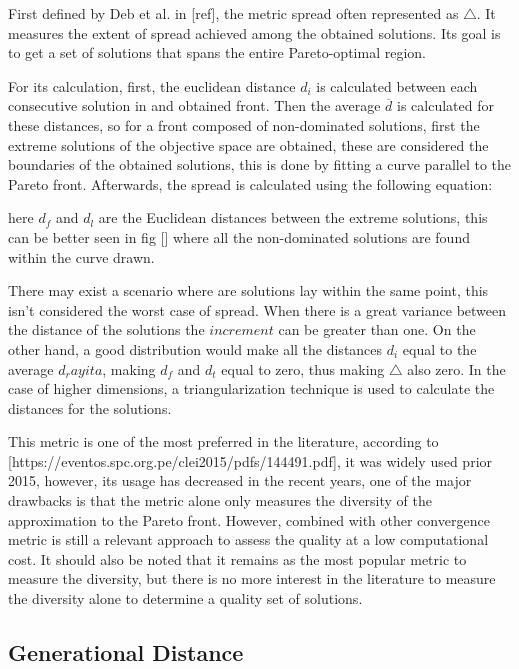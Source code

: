 First defined by Deb et al. in [ref], the metric spread often represented as $\bigtriangleup$. It measures the extent of spread achieved among the obtained solutions. Its goal is to get a set of solutions that spans the entire Pareto-optimal region.

For its calculation, first, the euclidean distance $d_i$ is calculated between each consecutive solution in and obtained front. Then the average $\overline{d}$ is calculated for these distances, so for a front composed of non-dominated solutions, first the extreme solutions of the objective space are obtained, these are considered the boundaries of the obtained solutions, this is done by fitting a curve parallel to the Pareto front. Afterwards, the spread is calculated using the following equation: 


here $d_f$ and $d_l$ are the Euclidean distances between the extreme solutions, this can be better seen in fig [] where all the non-dominated solutions are found within the curve drawn.


There may exist a scenario where are solutions lay within the same point, this isn't considered the worst case of spread. When there is a great variance between the distance of the solutions the $increment$ can be greater than one. On the other hand, a good distribution would make all the distances $d_i$ equal to the average $d_rayita$, making $d_f$ and $d_t$ equal to zero, thus making $\bigtriangleup$ also zero. In the case of higher dimensions, a triangularization technique is used to calculate the distances for the solutions.

This metric is one of the most preferred in the literature, according to [https://eventos.spc.org.pe/clei2015/pdfs/144491.pdf], it was widely used prior 2015, however, its usage has decreased in the recent years, one of the major drawbacks is that the metric alone only measures the diversity of the approximation to the Pareto front. However, combined with other convergence metric is still a relevant approach to assess the quality at a low computational cost. It should also be noted that it remains as the most popular metric to measure the diversity, but there is no more interest in the literature to measure the diversity alone to determine a quality set of solutions.

\subsection{Generational Distance}

